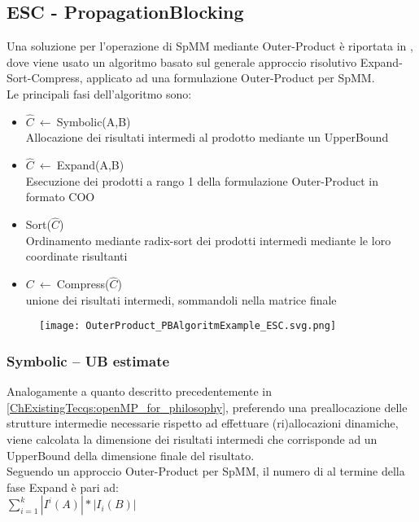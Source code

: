 \subsection{ESC - PropagationBlocking}
Una soluzione per l'operazione di SpMM mediante Outer-Product è riportata in \cite{ESC},
dove viene usato un algoritmo basato sul generale approccio risolutivo Expand-Sort-Compress, %
applicato ad una formulazione Outer-Product per SpMM.\\

Le principali fasi dell'algoritmo sono:
\begin{itemize}
	\item $\hat{C}~\leftarrow~$Symbolic(A,B) \\ Allocazione dei risultati intermedi al prodotto mediante un UpperBound
	\item $\hat{C}~\leftarrow~$Expand(A,B)	 \\ Esecuzione dei prodotti a rango 1 della formulazione Outer-Product in formato COO
	\item Sort($\hat{C}$) 					 \\ Ordinamento mediante radix-sort dei prodotti intermedi mediante le loro coordinate risultanti
	\item $C~\leftarrow~$Compress($\hat{C}$) \\ unione dei risultati intermedi, sommandoli nella matrice finale
\end{itemize}

\begin{figure}[h!]
  \centering \texttt{[image: OuterProduct\_PBAlgoritmExample\_ESC.svg.png]}
  \caption[Rappresentazione grafica degli step principali dell'algoritmo] 
  \decoRule \label{fig:OuterProduct_PBAlgoritmExample_ESC}
\end{figure}

\subsubsection{Symbolic -- UB estimate}
Analogamente a quanto descritto precedentemente in \ref{ChExistingTecqs:openMP_for_philosophy}, 
preferendo una preallocazione delle strutture intermedie necessarie rispetto ad effettuare (ri)allocazioni dinamiche, 
viene calcolata la dimensione dei risultati intermedi che corrisponde ad un UpperBound della dimensione finale del risultato.\\
Seguendo un approccio Outer-Product per SpMM, il numero di \nnz al termine della fase Expand è pari ad:\\
$ \sum\limits_{i = 1}^k  | I^i(A) | *| I_i(B) | $ \\ %
 
